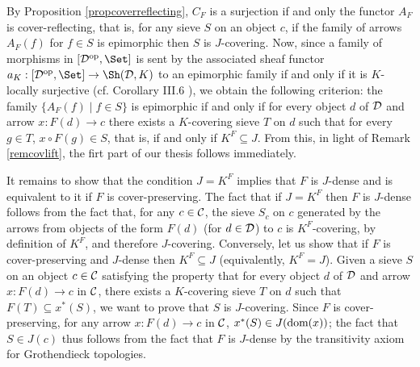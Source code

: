 \documentclass[a4paper,12pt]{article}
\begin{document}
\begin{proofs}
	By Proposition \ref{propcoverreflecting}, $C_{F}$ is a surjection if and only the functor $A_{F}$ is cover-reflecting, that is, for any sieve $S$ on an object $c$, if the family of arrows $A_{F}(f)$ for $f\in S$ is epimorphic then $S$ is $J$-covering. Now, since a family of morphisms in $[{\cal D}^{\textup{op}},\Set]$ is sent by the associated sheaf functor $a_K:[{\cal D}^{\textup{op}},\Set] \to \Sh({\cal D}, K)$ to an epimorphic family if and only if it is $K$-locally surjective (cf. Corollary III.6 \cite{MM}), we obtain the following criterion: the family $\{A_{F}(f) \mid f\in S \}$ is epimorphic if and only if for every object $d$ of $\cal D$ and arrow $x:F(d)\to c$ there exists a $K$-covering sieve $T$ on $d$ such that for every $g\in T$, $x\circ F(g)\in S$, that is, if and only if $K^{F}\subseteq J$. From this, in light of Remark \ref{remcovlift}, the firt part of our thesis follows immediately. 
	
	It remains to show that the condition $J=K^{F}$ implies that $F$ is $J$-dense and is equivalent to it if $F$ is cover-preserving. 
	The fact that if $J=K^{F}$ then $F$ is $J$-dense follows from the fact that, for any $c\in {\cal C}$, the sieve $S_{c}$ on $c$ generated by the arrows from objects of the form $F(d)$ (for $d\in {\cal D}$) to $c$ is $K^{F}$-covering, by definition of $K^{F}$, and therefore $J$-covering. Conversely, let us show that if $F$ is cover-preserving and $J$-dense then $K^{F}\subseteq J$ (equivalently, $K^{F}=J$). Given a sieve $S$ on an object $c\in {\cal C}$ satisfying the property that for every object $d$ of $\cal D$ and arrow $x:F(d)\to c$ in $\cal C$, there exists a $K$-covering sieve $T$ on $d$ such that $F(T)\subseteq x^{\ast}(S)$, we want to prove that $S$ is $J$-covering. Since $F$ is cover-preserving, for any arrow $x:F(d)\to c$ in $\cal C$, $x^{\ast}(S)\in J(\textup{dom}(x))$; the fact that $S\in J(c)$ thus follows from the fact that $F$ is $J$-dense by the transitivity axiom for Grothendieck topologies.
\end{proofs}
\end{document}
